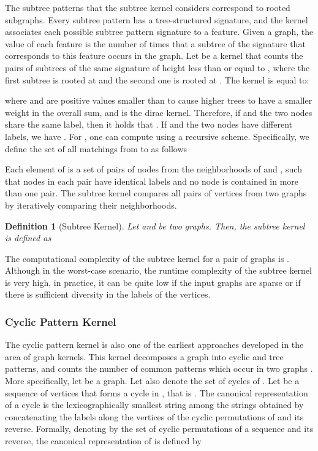 \documentclass[twoside,11pt]{article}
\newtheorem{definition}{Definition}
\begin{document}
The subtree patterns that the subtree kernel considers correspond to rooted subgraphs.
Every subtree pattern has a tree-structured signature, and the kernel associates each possible subtree pattern signature to a feature.
Given a graph, the value of each feature is the number of times that a subtree of the signature that corresponds to this feature occurs in the graph.
Let  be a kernel that counts the pairs of subtrees of the same signature of height less than or equal to , where the first subtree is rooted at  and the second one is rooted at .
The kernel  is equal to:

where  and  are positive values smaller than  to cause higher trees to have a smaller weight in the overall sum, and  is the dirac kernel.
Therefore, if  and the two nodes share the same label, then it holds that .
If  and the two nodes have different labels, we have .
For , one can compute  using a recursive scheme.
Specifically, we define the set of all matchings from  to  as follows

Each element  of  is a set of pairs of nodes from the neighborhoods of  and , such that nodes in each pair have identical labels and no node is contained in more than one pair.
The subtree kernel compares all pairs of vertices from two graphs by iteratively comparing their neighborhoods.
\begin{definition}[Subtree Kernel]
  Let  and  be two graphs.
  Then, the subtree kernel is defined as
  
\end{definition}
The computational complexity of the subtree kernel for a pair of graphs is .
Although in the worst-case scenario, the runtime complexity of the subtree kernel is very high, in practice, it can be quite low if the input graphs are sparse or if there is sufficient diversity in the labels of the vertices.


\subsubsection{Cyclic Pattern Kernel}
The cyclic pattern kernel is also one of the earliest approaches developed in the area of graph kernels.
This kernel decomposes a graph into cyclic and tree patterns, and counts the number of common patterns which occur in two graphs .
More specifically, let  be a graph.
Let also  denote the set of cycles of .
Let  be a sequence of vertices that forms a cycle in , that is .
The canonical representation of a cycle  is the lexicographically smallest string  among the strings obtained by concatenating the labels along the vertices of the cyclic permutations of  and its reverse.
Formally, denoting by  the set of cyclic permutations of a sequence  and its reverse, the canonical representation of  is defined by
\end{document}
